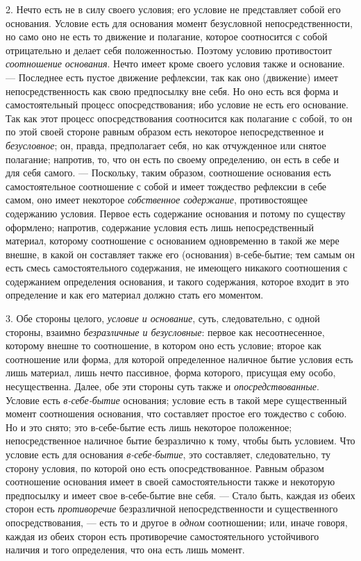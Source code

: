 2. Нечто есть не в силу своего условия; его условие не представляет собой
его основания. Условие есть для основания момент безусловной
непосредственности, но само оно не есть то движение и полагание, которое
соотносится с собой отрицательно и делает себя положенностью. Поэтому
условию противостоит {\em соотношение основания}. Нечто
имеет кроме своего условия также и основание. — Последнее есть пустое
движение рефлексии, так как оно (движение) имеет непосредственность как
свою предпосылку вне себя. Но оно есть вся форма и самостоятельный процесс
опосредствования; ибо условие не есть его основание. Так как этот процесс
опосредствования соотносится как полагание с собой, то он по этой своей
стороне равным образом есть некоторое непосредственное и
{\em безусловное}; он, правда, предполагает себя, но
как отчужденное или снятое полагание; напротив, то, что он есть по своему
определению, он есть в себе и для себя самого. — Поскольку, таким образом,
соотношение основания есть самостоятельное соотношение с собой и имеет
тождество рефлексии в себе самом, оно имеет некоторое
{\em собственное содержание}, противостоящее содержанию
условия. Первое есть содержание основания и потому по существу оформлено;
напротив, содержание условия есть лишь непосредственный материал, которому
соотношение с основанием одновременно в такой же мере внешне, в какой он
составляет также его (основания) в-себе-бытие; тем самым он есть смесь
самостоятельного содержания, не имеющего никакого соотношения с содержанием
определения основания, и такого содержания, которое входит в это
определение и как его материал должно стать его моментом.

3. Обе стороны целого, {\em условие и основание}, суть,
следовательно, с одной стороны, взаимно
{\em безразличные и безусловные}: первое как
несоотнесенное, которому внешне то соотношение, в котором оно есть условие;
второе как соотношение или форма, для которой определенное наличное бытие
условия есть лишь материал, лишь нечто пассивное, форма которого, присущая
ему особо, несущественна. Далее, обе эти стороны суть также и
{\em опосредствованные}. Условие есть
{\em в-себе-бытие} основания; условие есть в такой мере
существенный момент соотношения основания, что составляет простое его
тождество с собою. Но и это снято; это в-себе-бытие есть лишь некоторое
положенное; непосредственное наличное бытие безразлично к тому, чтобы быть
условием. Что условие есть для основания
{\em в-себе-бытие}, это составляет, следовательно, ту
сторону условия, по которой оно есть опосредствованное. Равным образом
соотношение основания имеет в своей самостоятельности также и некоторую
предпосылку и имеет свое в-себе-бытие вне себя. — Стало быть, каждая из
обеих сторон есть {\em противоречие} безразличной
непосредственности и существенного опосредствования, — есть то и другое в
{\em одном} соотношении; или, иначе говоря, каждая из
обеих сторон есть противоречие самостоятельного устойчивого наличия и того
определения, что она есть лишь момент.

